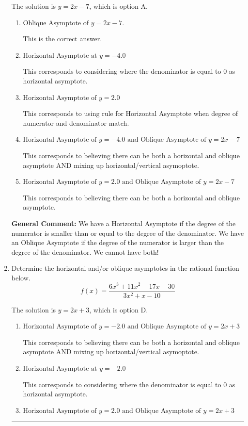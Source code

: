 \documentclass{extbook}[14pt]
\newcommand{\litem}[1]{\item #1

\rule{\textwidth}{0.4pt}}
\begin{document}
\begin{enumerate}
{The solution is \( y = 2x -7 \), which is option A.\begin{enumerate}[label=\Alph*.]
\item \( \text{Oblique Asymptote of } y = 2x -7. \)

This is the correct answer.
\item \( \text{Horizontal Asymptote at } y = -4.0 \)

This corresponds to considering where the denominator is equal to 0 as horizontal asymptote.
\item \( \text{Horizontal Asymptote of } y = 2.0  \)

This corresponds to using rule for Horizontal Asymptote when degree of numerator and denominator match.
\item \( \text{Horizontal Asymptote of } y = -4.0 \text{ and Oblique Asymptote of } y = 2x -7 \)

This corresponds to believing there can be both a horizontal and oblique asymptote AND mixing up horizontal/vertical asymoptote.
\item \( \text{Horizontal Asymptote of } y = 2.0 \text{ and Oblique Asymptote of } y = 2x -7 \)

This corresponds to believing there can be both a horizontal and oblique asymptote.
\end{enumerate}

\textbf{General Comment:} We have a Horizontal Asymptote if the degree of the numerator is smaller than or equal to the degree of the denominator. We have an Oblique Asymptote if the degree of the numerator is larger than the degree of the denominator. We cannot have both!
}
\litem{
Determine the horizontal and/or oblique asymptotes in the rational function below.
\[ f(x) = \frac{6x^{3} +11 x^{2} -17 x -30}{3x^{2} +x -10} \]

The solution is \( y = 2x + 3 \), which is option D.\begin{enumerate}[label=\Alph*.]
\item \( \text{Horizontal Asymptote of } y = -2.0 \text{ and Oblique Asymptote of } y = 2x + 3 \)

This corresponds to believing there can be both a horizontal and oblique asymptote AND mixing up horizontal/vertical asymoptote.
\item \( \text{Horizontal Asymptote at } y = -2.0 \)

This corresponds to considering where the denominator is equal to 0 as horizontal asymptote.
\item \( \text{Horizontal Asymptote of } y = 2.0 \text{ and Oblique Asymptote of } y = 2x + 3 \)


\end{enumerate}}
\end{enumerate}
\end{document}
